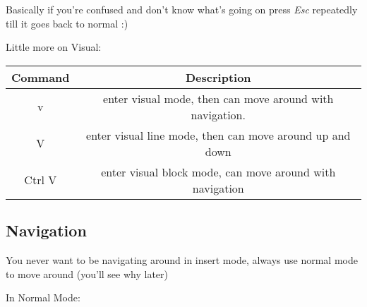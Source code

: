\documentclass[12pt, letterpaper]{article}
\begin{document}
Basically if you're confused and don't know what's going on press \textit{Esc}
repeatedly till it goes back to normal :)


Little more on Visual:

\begin{table}[H]
    \begin{tabular}{|c|c|}
        Command & Description \\
        \hline
        v & enter visual mode, then can move around with navigation. \\
        V & enter visual line mode, then can move around up and down \\
        Ctrl V& enter visual block mode, can move around with navigation \\
    \end{tabular}
\end{table}



\subsection{Navigation}
You never want to be navigating around in insert mode, always use normal mode
to move around (you'll see why later)

In Normal Mode:
\end{document}
